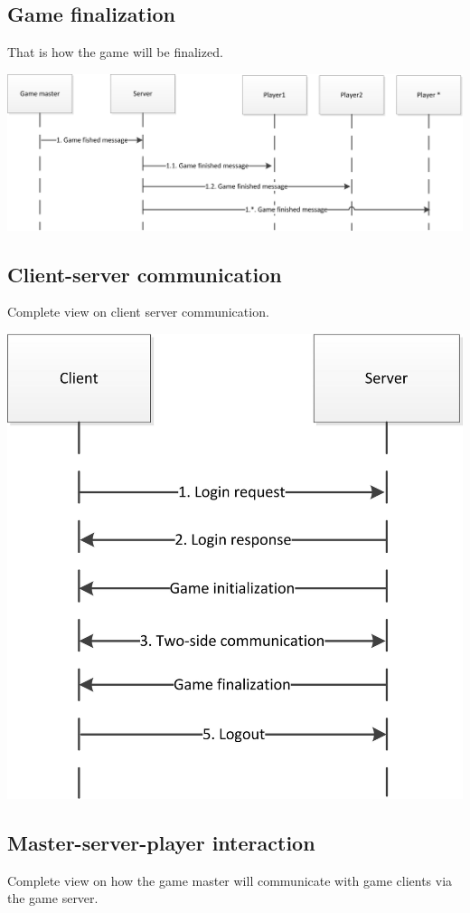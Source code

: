 \documentclass{article}
\begin{document}
\subsection{Game finalization}
That is how the game will be finalized.
 
\includegraphics[scale=1.00]{UGS_events_Game_finalization.jpg}


\pagebreak[4]


\subsection{Client-server communication}
Complete view on client server communication.

\includegraphics[scale=1.00]{UGS_events_Client-server_communication.jpg}

\subsection{Master-server-player interaction}
Complete view on how the game master will communicate with game clients via the game server.
\end{document}
